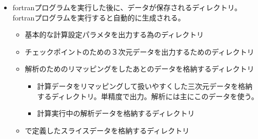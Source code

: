 \documentclass[letterpaper,10pt,dvipdfmx,report]{sphinxmanual}
\begin{document}
\begin{itemize}
\begin{description}
\end{description}

\item {} \begin{description}
\sphinxAtStartPar
fortranプログラムを実行した後に、データが保存されるディレクトリ。fortranプログラムを実行すると自動的に生成される。
\begin{itemize}
\item {} \begin{description}
\sphinxAtStartPar
基本的な計算設定パラメタを出力する為のディレクトリ

\end{description}

\item {} \begin{description}
\sphinxAtStartPar
チェックポイントのための３次元データを出力するためのディレクトリ

\end{description}

\item {} \begin{description}
\sphinxAtStartPar
解析のためのリマッピングをしたあとのデータを格納するディレクトリ
\begin{itemize}
\item {} \begin{description}
\sphinxAtStartPar
計算データをリマッピングして扱いやすくした三次元データを格納するディレクトリ。単精度で出力。解析には主にこのデータを使う。

\end{description}

\item {} \begin{description}
\sphinxAtStartPar
計算実行中の解析データを格納するディレクトリ

\end{description}

\end{itemize}

\end{description}

\item {} \begin{description}
\sphinxAtStartPar
{} で定義したスライスデータを格納するディレクトリ


\end{description}
\end{itemize}
\end{description}
\end{itemize}
\end{document}
